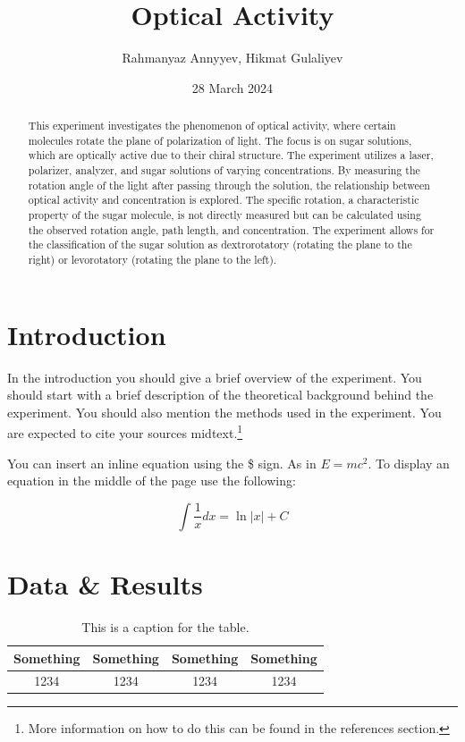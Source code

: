 \documentclass[10pt]{article}
\title{Optical Activity} %
\author{Rahmanyaz Annyyev, Hikmat Gulaliyev} %
\date{28 March 2024} %
\begin{document}
\maketitle

\begin{abstract}
    This experiment investigates the phenomenon of optical activity, where certain molecules rotate the plane of polarization of light. The focus is on sugar solutions, which are optically active due to their chiral structure. The experiment utilizes a laser, polarizer, analyzer, and sugar solutions of varying concentrations. By measuring the rotation angle of the light after passing through the solution, the relationship between optical activity and concentration is explored.  The specific rotation, a characteristic property of the sugar molecule, is not directly measured but can be calculated using the observed rotation angle, path length, and concentration. The experiment allows for the classification of the sugar solution as dextrorotatory (rotating the plane to the right) or levorotatory (rotating the plane to the left).
\end{abstract}

\section{Introduction}

In the introduction you should give a brief overview of the experiment. You should start with a brief description of the theoretical background behind the experiment. You should also mention the methods used in the experiment. You are expected to cite your sources\cite{Bravyi_2020} midtext.\footnote{More information on how to do this can be found in the references section.}


You can insert an inline equation using the \$ sign. As in $E=mc^2$. To display an equation in the middle of the page use the following:

\begin{equation}
    \int \frac{1}{x} dx = \ln|x| + C
\end{equation}

\section{Data \& Results}

\begin{table}[ht]
    \centering
    \begin{tabular}{|c|c|c|c|}
        \hline
        Something & Something & Something & Something \\
        \hline
        1234 & 1234 & 1234 & 1234 \\
        \hline
    \end{tabular}
    \caption{This is a caption for the table.}
    \label{tab:ex}
\end{table}
\end{document}
